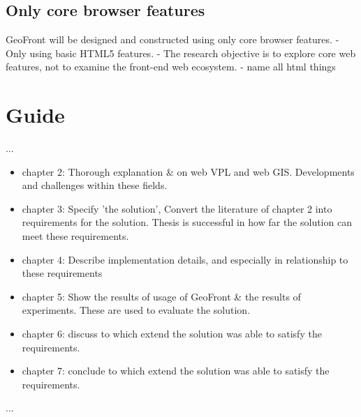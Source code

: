 \subsection*{ Only core browser features }
GeoFront will be designed and constructed using only core browser features. 
- Only using basic HTML5 features.
- The research objective is to explore core web features, not to examine the front-end web ecosystem. 
- name all html things

\section{Guide}

...
\begin{itemize}[\m{->}]
  \item chapter 2: Thorough explanation \& on web VPL and web GIS. 
  \subitem Developments and challenges within these fields.
  \item chapter 3: Specify 'the solution', Convert the literature of chapter 2 into requirements for the solution. 
  \subitem Thesis is successful in how far the solution can meet these requirements. 
  \item chapter 4: Describe implementation details, and especially in relationship to these requirements
  \item chapter 5: Show the results of usage of GeoFront \& the results of experiments.
  \subitem These are used to evaluate the solution.
  \item chapter 6: discuss to which extend the solution was able to satisfy the requirements.
  \item chapter 7: conclude to which extend the solution was able to satisfy the requirements.
\end{itemize}

...